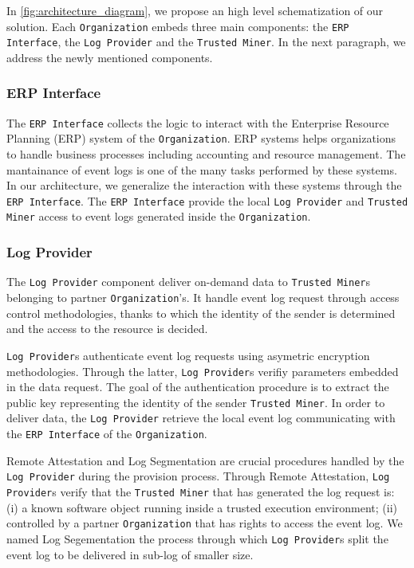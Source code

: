In \cref{fig:architecture_diagram}, we propose an high level schematization of our solution. Each \texttt{Organization} embeds three main components: the \texttt{ERP Interface}, the \texttt{Log Provider} and the \texttt{Trusted Miner}. In the next paragraph, we address the newly mentioned components.
\subsubsection{ERP Interface}
The \texttt{ERP Interface} collects the logic to interact with the Enterprise Resource Planning (ERP) system  of the \texttt{Organization}. ERP systems helps organizations to
handle business processes including accounting and resource management. The mantainance of event logs is one of the many tasks performed by these systems. In our architecture, we generalize the interaction with these systems through the \texttt{ERP Interface}. The \texttt{ERP Interface} provide the local \texttt{Log Provider} and \texttt{Trusted Miner} access to event logs generated inside the \texttt{Organization}.
\subsubsection{Log Provider}
The \texttt{Log Provider} component deliver on-demand data to \texttt{Trusted Miner}s belonging to partner \texttt{Organization}'s. It handle event log request through access control methodologies, thanks to which the identity of the sender is determined and the access to the resource is decided.

\texttt{Log Provider}s authenticate event log requests using asymetric encryption methodologies. Through the latter, \texttt{Log Provider}s verifiy parameters embedded in the data request. The goal of the authentication procedure is to extract the public key representing the identity of the sender \texttt{Trusted Miner}. In order to deliver data, the \texttt{Log Provider} retrieve the local event log communicating with the \texttt{ERP Interface} of the \texttt{Organization}.

Remote Attestation and Log Segmentation are crucial procedures handled by the \texttt{Log Provider} during the provision process. Through Remote Attestation, \texttt{Log Provider}s verify that the \texttt{Trusted Miner} that has generated the log request  is: (i) a known software object running inside a trusted execution environment; (ii) controlled by a partner \texttt{Organization} that has rights to access the event log. We named Log Segementation the process through which \texttt{Log Provider}s split the event log to be delivered in sub-log of smaller size.

